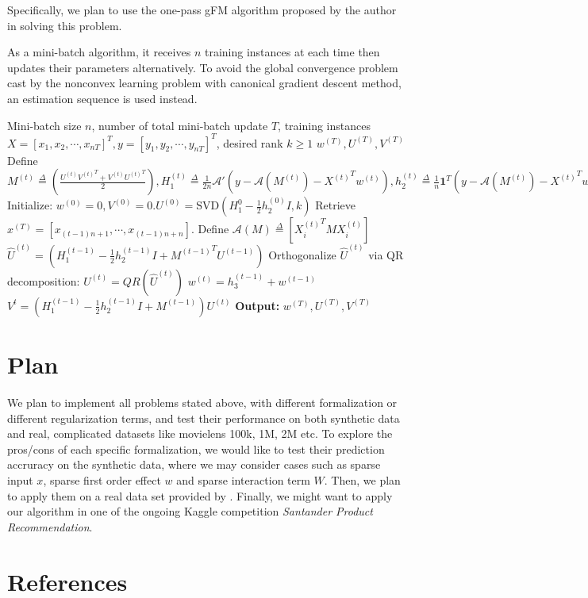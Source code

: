 \documentclass{article}
\begin{document}
 
Specifically, we plan to use the one-pass gFM algorithm proposed by the author in solving this problem.
 
 
As a mini-batch algorithm, it receives $n$ training instances at each time then updates their parameters alternatively. To avoid the global convergence problem cast by the nonconvex learning problem with canonical gradient descent method, an estimation sequence is used instead.
 
 
\begin{algorithm}
 \caption{One pass algorithm solving \cref{eq:one_pass_gfm}}
 \label{algo:alm}
 \begin{algorithmic}[1]
 \REQUIRE Mini-batch size $n$, number of total mini-batch update $T$, training instances $X=[x_1, x_2,\cdots, x_{nT}]^T, y=[y_1, y_2, \cdots, y_{nT}]^T$, desired rank $k \geq 1$
 \ENSURE $\mathit{w}^{(T)}, \mathit{U}^{(T)}, \mathit{V}^{(T)}$
 \STATE Define $M^{(t)}\overset{\Delta}{=}\left( \frac{U^{(t)}{V^{(t)}}^T+V^{(t)}{U^{(t)}}^T}{2}\right),
H_1^{(t)}\overset{\Delta}{=}\frac{1}{2n}\mathcal{A}'\left(y-\mathcal{A}(M^{(t)})-{X^{(t)}}^Tw^{(t)}\right),
h_2^{(t)}\overset{\Delta}{=}\frac{1}{n}\mathbf{1}^T\left(y-\mathcal{A}(M^{(t)})-{X^{(t)}}^Tw^{(t)}\right),
h_3^{(t)}\overset{\Delta}{=}\frac{1}{n}X^{(t)}\left(y-\mathcal{A}(M^{(t)})-{X^{(t)}}^Tw^{(t)}\right)$
 \STATE Initialize: $\mathit{w}^{(0)}=0, \mathit{V}^{(0)}=0. \mathit{U}^{(0)}=\mathrm{SVD}\left(H_1^{0}-\frac{1}{2}h_2^{(0)}I,k\right)$
     \STATE Retrieve $x^{(T)}=[x_{(t-1)n+1},\cdots,x_{(t-1)n+n}]$. Define $\mathcal{A}(M) \overset{\Delta}{=} \left[{X_i^{(t)}}^TMX_i^{(t)}\right]$
     \STATE $\hat{U}^{(t)}=\left(H_1^{(t-1)}-\frac{1}{2}h_2^{(t-1)}I+{M^{(t-1)}}^TU^{(t-1)}\right)$
     \STATE Orthogonalize $\hat{U}^{(t)}$ via QR decomposition: $U^{(t)}=QR(\hat{U}^{(t)})$  
     \STATE $\mathit{w}^{(t)}=\mathit{h}_3^{(t-1)}+\mathit{w}^{(t-1)}$
     \STATE $\mathit{V}^{t}=(\mathit{H}_1^{(t-1)}-\frac{1}{2}h_2^{(t-1)}I+\mathit{M}^{(t-1)})\mathit{U}^{(t)}$
    \ENDFOR
\STATE \textbf{Output:} $\mathit{w}^{(T)},\mathit{U}^{(T)},\mathit{V}^{(T)}$
 \end{algorithmic}
\end{algorithm}

\section{Plan}
 
We plan to implement all problems stated above, with different formalization or different regularization terms, and test their performance on both synthetic data and real, complicated datasets like movielens 100k, 1M, 2M etc. To explore the pros/cons of each specific formalization, we would like to test their prediction accruracy on the synthetic data, where we may consider cases such as sparse input $x$, sparse first order effect $w$ and sparse interaction term $W$. Then, we plan to apply them on a real data set provided by \cite{FM_paper}. Finally, we might want to apply our algorithm in one of the ongoing Kaggle competition \textit{Santander Product Recommendation}.


\section*{References}
\small{
\renewcommand{\section}[2]{}%
 

}
\end{document}
